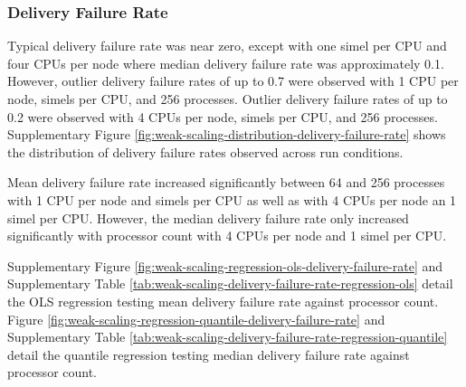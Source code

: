 \subsubsection{Delivery Failure Rate}

Typical delivery failure rate was near zero, except with one simel per CPU and four CPUs per node where median delivery failure rate was approximately 0.1.
However, outlier delivery failure rates of up to 0.7 were observed with 1 CPU per node,  simels per CPU, and 256 processes.
Outlier delivery failure rates of up to 0.2 were observed with 4 CPUs per node,  simels per CPU, and 256 processes.
Supplementary Figure \ref{fig:weak-scaling-distribution-delivery-failure-rate} shows the distribution of delivery failure rates observed across run conditions.

Mean delivery failure rate increased significantly between 64 and 256 processes with 1 CPU per node and  simels per CPU as well as with 4 CPUs per node an 1 simel per CPU.
However, the median delivery failure rate only increased significantly with processor count with 4 CPUs per node and 1 simel per CPU.



Supplementary Figure \ref{fig:weak-scaling-regression-ols-delivery-failure-rate} and Supplementary Table \ref{tab:weak-scaling-delivery-failure-rate-regression-ols} detail the OLS regression testing mean delivery failure rate against processor count.
Figure \ref{fig:weak-scaling-regression-quantile-delivery-failure-rate} and Supplementary Table \ref{tab:weak-scaling-delivery-failure-rate-regression-quantile} detail the quantile regression testing median delivery failure rate against processor count.
